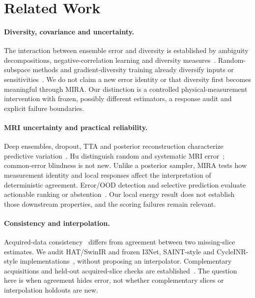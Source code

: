 \documentclass[10pt,twocolumn,letterpaper]{article}
\begin{document}
\section{Related Work}
\paragraph{Diversity, covariance and uncertainty.}
The interaction between ensemble error and diversity is established by ambiguity decompositions, negative-correlation learning and diversity measures~\cite{krogh1994ensembles,liu1999negative,kuncheva2003diversity,brown2005diversity,ortega2022diversity}. Random-subspace methods and gradient-diversity training already diversify inputs or sensitivities~\cite{ho1998subspace,kariyappa2019diversity}. We do not claim a new error identity or that diversity first becomes meaningful through MIRA. Our distinction is a controlled physical-measurement intervention with frozen, possibly different estimators, a response audit and explicit failure boundaries.

\paragraph{MRI uncertainty and practical reliability.}
Deep ensembles, dropout, TTA and posterior reconstruction characterize predictive variation~\cite{lakshminarayanan2017ensembles,gal2016dropout,wang2019tta,edupuganti2021uncertainty,narnhofer2022bayesian,luo2023diffusion}. Hu \etal distinguish random and systematic MRI error~\cite{hu2021predict}; common-error blindness is not new. Unlike a posterior sampler, MIRA tests how measurement identity and local responses affect the interpretation of deterministic agreement. Error/OOD detection and selective prediction evaluate actionable ranking or abstention~\cite{hendrycks2017baseline,geifman2017selective}. Our local energy result does not establish those downstream properties, and the scoring failures remain relevant.

\paragraph{Consistency and interpolation.}
Acquired-data consistency~\cite{lustig2010spirit} differs from agreement between two missing-slice estimates. We audit HAT/SwinIR and frozen I3Net, SAINT-style and CycleINR-style implementations~\cite{song2024i3net,peng2020saint,fang2024cycleinr}, without proposing an interpolator. Complementary acquisitions and held-out acquired-slice checks are established~\cite{greenspan2002interslice,nicastro2022shift,horvath2017highorder}. The question here is when agreement hides error, not whether complementary slices or interpolation holdouts are new.
\end{document}
